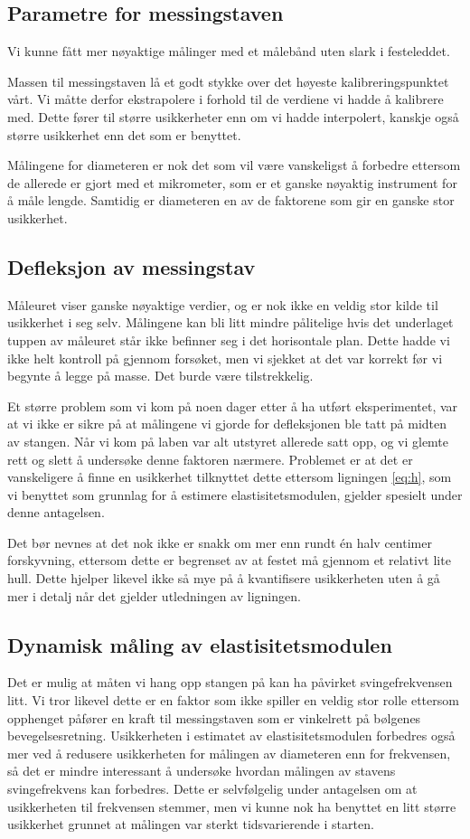 \documentclass[a4paper,11pt, twocolumn]{article}
\begin{document}
\subsection{Parametre for messingstaven}
Vi kunne fått mer nøyaktige målinger med et målebånd uten slark i festeleddet.

Massen til messingstaven lå et godt stykke over det høyeste kalibreringspunktet vårt. Vi måtte derfor ekstrapolere i forhold til de verdiene vi hadde å kalibrere med. Dette fører til større usikkerheter enn om vi hadde interpolert, kanskje også større usikkerhet enn det som er benyttet.

Målingene for diameteren er nok det som vil være vanskeligst å forbedre ettersom de allerede er gjort med et mikrometer, som er et ganske nøyaktig instrument for å måle lengde. Samtidig er diameteren en av de faktorene som gir en ganske stor usikkerhet.

\subsection{Defleksjon av messingstav}
Måleuret viser ganske nøyaktige verdier, og er nok ikke en veldig stor kilde til usikkerhet i seg selv. Målingene kan bli litt mindre pålitelige hvis det underlaget tuppen av måleuret står ikke befinner seg i det horisontale plan. Dette hadde vi ikke helt kontroll på gjennom forsøket, men vi sjekket at det var korrekt før vi begynte å legge på masse. Det burde være tilstrekkelig.

Et større problem som vi kom på noen dager etter å ha utført eksperimentet, var at vi ikke er sikre på at målingene vi gjorde for defleksjonen ble tatt på midten av stangen. Når vi kom på laben var alt utstyret allerede satt opp, og vi glemte rett og slett å undersøke denne faktoren nærmere. Problemet er at det er vanskeligere å finne en usikkerhet tilknyttet dette ettersom ligningen \eqref{eq:h}, som vi benyttet som grunnlag for å estimere elastisitetsmodulen, gjelder spesielt under denne antagelsen. 

Det bør nevnes at det nok ikke er snakk om mer enn rundt \'en halv centimer forskyvning, ettersom dette er begrenset av at festet må gjennom et relativt lite hull. Dette hjelper likevel ikke så mye på å kvantifisere usikkerheten uten å gå mer i detalj når det gjelder utledningen av ligningen.

\subsection{Dynamisk måling av elastisitetsmodulen}
Det er mulig at måten vi hang opp stangen på kan ha påvirket svingefrekvensen litt. Vi tror likevel dette er en faktor som ikke spiller en veldig stor rolle ettersom opphenget påfører en kraft til messingstaven som er vinkelrett på bølgenes bevegelsesretning. Usikkerheten i estimatet av elastisitetsmodulen forbedres også mer ved å redusere usikkerheten for målingen av diameteren enn for frekvensen, så det er mindre interessant å undersøke hvordan målingen av stavens svingefrekvens kan forbedres. Dette er selvfølgelig under antagelsen om at usikkerheten til frekvensen stemmer, men vi kunne nok ha benyttet en litt større usikkerhet grunnet at målingen var sterkt tidsvarierende i starten.
\end{document}
